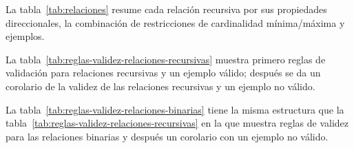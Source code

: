 La tabla~\ref{tab:relaciones} resume cada relación recursiva por sus propiedades direccionales, la combinación de restricciones de cardinalidad mínima/máxima y ejemplos. 


La tabla~\ref{tab:reglas-validez-relaciones-recursivas} muestra primero reglas de validación para relaciones recursivas y un ejemplo válido; después se da un corolario de la validez de las relaciones recursivas y un ejemplo no válido.


La tabla~\ref{tab:reglas-validez-relaciones-binarias} tiene la misma estructura que la tabla~\ref{tab:reglas-validez-relaciones-recursivas} en la que muestra reglas de validez para las relaciones binarias y después un corolario con un ejemplo no válido.

